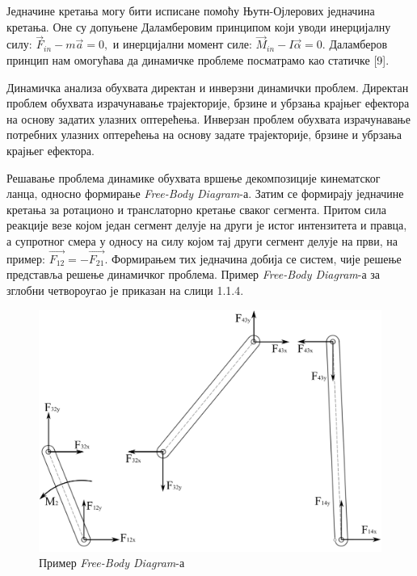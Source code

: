 \documentclass[12pt]{article}
\begin{document}
Једначине кретања могу бити исписане помоћу Њутн-Ојлерових једначина кретања. Оне су допуњене Даламберовим принципом који уводи инерцијалну силу: $\vec{F}_{in} - m\vec{a} = 0,$ и инерцијални момент силе: $\vec{M}_{in} - I\vec{\alpha} = 0$. Даламберов принцип нам омогућава да динамичке проблеме посматрамо као статичке [9].

Динамичка анализа обухвата директан и инверзни динамички проблем. Директан проблем обухвата израчунавање трајекторије, брзине и убрзања крајњег ефектора на основу задатих улазних оптерећења. Инверзан проблем обухвата израчунавање потребних улазних оптерећења на основу задате трајекторије, брзине и убрзања крајњег ефектора.

Решавање проблема динамике обухвата вршење декомпозиције кинематског ланца, односно формирање \textit{Free-Body Diagram}-а. Затим се формирају једначине кретања за ротационо и транслаторно кретање сваког сегмента. Притом сила реакције везе којом један сегмент делује на други је истог интензитета и правца, а супротног смера у односу на силу којом тај други сегмент делује на први, на пример: $\vec{F_{12}} = -\vec{F_{21}}$. Формирањем тих једначина добија се систем, чије решење представља решење динамичког проблема. Пример \textit{Free-Body Diagram}-а за зглобни четвороугао је приказан на слици 1.1.4.

\begin{figure}[H]
    \centering
    \includegraphics[width=12cm]{figures/4bar_fbd.jpg}
    \caption{Пример \textit{Free-Body Diagram}-а}
    \label{fig:фбд_пример}
\end{figure}
\end{document}
